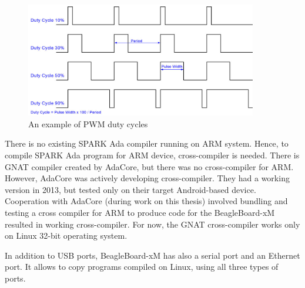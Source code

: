 \begin{figure}[ht]%
    \begin{center}
      \includegraphics[width=0.9\textwidth]{figures/pwm.png}      
    \end{center}
    \caption{An example of PWM duty cycles}
    \label{figure:pwm}
\end{figure}

There is no existing SPARK Ada compiler running on ARM system. Hence, to compile SPARK Ada program for ARM device, cross-compiler is needed. There is GNAT compiler \cite{Horn:Thesis} created by AdaCore, but there was no cross-compiler for ARM. However, AdaCore was actively developing cross-compiler. They had a working version in 2013, but tested only on their target Android-based device. Cooperation with AdaCore (during work on this thesis) involved bundling and testing a cross compiler for ARM to produce code for the BeagleBoard-xM resulted in working cross-compiler. For now, the GNAT cross-compiler works only on Linux 32-bit operating system.

In addition to USB ports, BeagleBoard-xM has also a serial port and an Ethernet port. It allows to copy programs compiled on Linux, using all three types of ports. 
